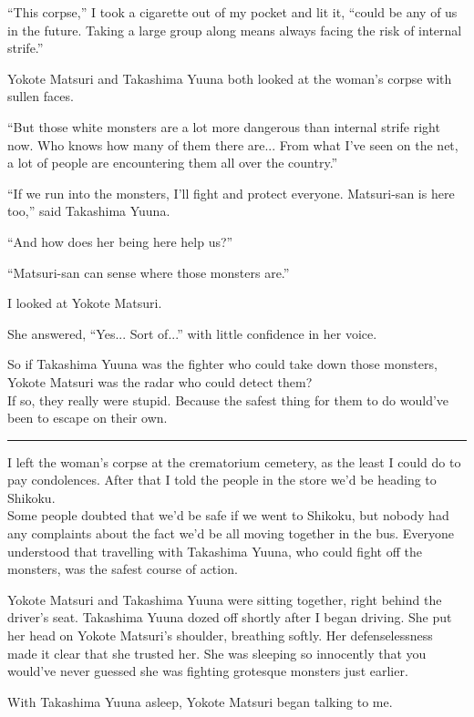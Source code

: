 ``This corpse,'' I took a cigarette out of my pocket and lit it, ``could be any of us in the future. Taking a large group along means always facing the risk of internal strife.''

Yokote Matsuri and Takashima Yuuna both looked at the woman's corpse with sullen faces.

``But those white monsters are a lot more dangerous than internal strife right now. Who knows how many of them there are... From what I've seen on the net, a lot of people are encountering them all over the country.''

``If we run into the monsters, I'll fight and protect everyone. Matsuri-san is here too,'' said Takashima Yuuna.

``And how does her being here help us?''

``Matsuri-san can sense where those monsters are.''

I looked at Yokote Matsuri.

She answered, ``Yes... Sort of...'' with little confidence in her voice.

So if Takashima Yuuna was the fighter who could take down those monsters, Yokote Matsuri was the radar who could detect them?\\
If so, they really were stupid. Because the safest thing for them to do would've been to escape on their own.

\vspace{\baselineskip}
\hrule
\vspace{\baselineskip}

I left the woman's corpse at the crematorium cemetery, as the least I could do to pay condolences. After that I told the people in the store we'd be heading to Shikoku. \\
Some people doubted that we'd be safe if we went to Shikoku, but nobody had any complaints about the fact we'd be all moving together in the bus. Everyone understood that travelling with Takashima Yuuna, who could fight off the monsters, was the safest course of action.

Yokote Matsuri and Takashima Yuuna were sitting together, right behind the driver's seat. Takashima Yuuna dozed off shortly after I began driving. She put her head on Yokote Matsuri's shoulder, breathing softly. Her defenselessness made it clear that she trusted her. She was sleeping so innocently that you would've never guessed she was fighting grotesque monsters just earlier.

With Takashima Yuuna asleep, Yokote Matsuri began talking to me.

